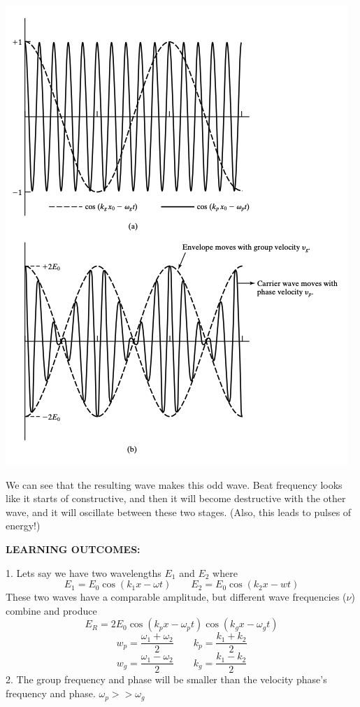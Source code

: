\documentclass[10pt]{article}
\begin{document}
\begin{center}
    \includegraphics*[scale = .25]{imgs/book-example-beat-frequency.png}
\end{center}
We can see that the resulting wave makes this odd wave. Beat frequency looks like it starts of constructive, and then it will become destructive with the other wave, and it will oscillate between these two stages. (Also, this leads to pulses of energy!)

\newblock

\textbf{LEARNING OUTCOMES:} \\ 
\fbox
{
    \begin{minipage}{\linewidth}
        
    
    1. Lets say we have two wavelengths $E_1$ and $E_2$ where
    \[E_1 = E_0\cos(k_1x - \omega t) \qquad E_2 = E_0 \cos(k_2x - wt)\]
    These two waves have a comparable amplitude, but different wave frequencies ($\nu$) combine and produce 
    \[E_R = 2E_0\cos(k_px - \omega_pt)\cos(k_gx-\omega_gt)\]
    \[w_p = \frac{\omega_1 + \omega_2}{2} \qquad k_p = \frac{k_1 + k_2}{2} \]
    \[w_g = \frac{\omega_1 - \omega_2}{2} \qquad k_g = \frac{k_1 - k_2}{2} \]
    2. The group frequency and phase will be smaller than the velocity phase's frequency and phase. $\omega_p >> \omega_g$
    \end{minipage}
}
\end{document}
